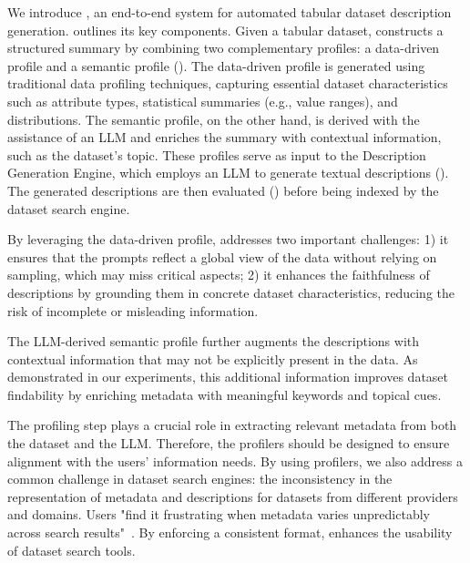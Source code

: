 %
We introduce \SystemName, an end-to-end system for automated tabular dataset description generation.
 outlines its key components.  Given a tabular dataset, \SystemName constructs a structured summary by combining two complementary profiles: a data-driven profile and a semantic profile (). The data-driven profile is generated using traditional data profiling techniques, capturing essential dataset characteristics such as attribute types, statistical summaries (e.g., value ranges), and distributions. The semantic profile, on the other hand, is derived with the assistance of an LLM and enriches the summary with contextual information, such as the dataset's topic.
%
These profiles serve as input to the Description Generation Engine, which employs an LLM to generate textual descriptions (). The generated descriptions are then evaluated () before being indexed by the dataset search engine.

By leveraging the data-driven profile, \SystemName addresses two important challenges: 1) it ensures that the prompts reflect a global view of the data without relying on sampling, which may miss critical aspects; 2) it enhances the faithfulness of descriptions by grounding them in concrete dataset characteristics, reducing the risk of incomplete or misleading information.

The  LLM-derived semantic profile further augments the descriptions with contextual information that may not be explicitly present in the data. As demonstrated in our experiments, this additional information improves dataset findability by enriching metadata with meaningful keywords and topical cues.

The profiling step plays a crucial role in extracting relevant metadata from both the dataset and the LLM. Therefore, the profilers should be designed to ensure alignment with the users' information needs.  
By using profilers, we also address a common challenge in dataset search engines: the inconsistency in the representation of metadata and descriptions for datasets from different providers and domains. Users "find it frustrating when metadata varies unpredictably across search results"~\cite{Sostek2024Discovering}. By enforcing a consistent format, \SystemName enhances the usability of dataset search tools.

